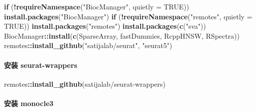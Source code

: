 \documentclass[
]{article}
\newenvironment{Shaded}{\begin{snugshade}}{\end{snugshade}}
\newcommand{\ControlFlowTok}[1]{\textcolor[rgb]{0.13,0.29,0.53}{\textbf{#1}}}
\newcommand{\DataTypeTok}[1]{\textcolor[rgb]{0.13,0.29,0.53}{#1}}
\newcommand{\KeywordTok}[1]{\textcolor[rgb]{0.13,0.29,0.53}{\textbf{#1}}}
\newcommand{\NormalTok}[1]{#1}
\newcommand{\OperatorTok}[1]{\textcolor[rgb]{0.81,0.36,0.00}{\textbf{#1}}}
\newcommand{\OtherTok}[1]{\textcolor[rgb]{0.56,0.35,0.01}{#1}}
\newcommand{\StringTok}[1]{\textcolor[rgb]{0.31,0.60,0.02}{#1}}
\begin{document}
\begin{Shaded}
\begin{Highlighting}[]
\ControlFlowTok{if}\NormalTok{ (}\OperatorTok{!}\KeywordTok{requireNamespace}\NormalTok{(}\StringTok{"BiocManager"}\NormalTok{, }\DataTypeTok{quietly =} \OtherTok{TRUE}\NormalTok{))}
    \KeywordTok{install.packages}\NormalTok{(}\StringTok{"BiocManager"}\NormalTok{)}
\ControlFlowTok{if}\NormalTok{ (}\OperatorTok{!}\KeywordTok{requireNamespace}\NormalTok{(}\StringTok{"remotes"}\NormalTok{, }\DataTypeTok{quietly =} \OtherTok{TRUE}\NormalTok{))}
    \KeywordTok{install.packages}\NormalTok{(}\StringTok{"remotes"}\NormalTok{)}
\KeywordTok{install.packages}\NormalTok{(}\KeywordTok{c}\NormalTok{(}\StringTok{"sva"}\NormalTok{))}
\NormalTok{BiocManager}\OperatorTok{::}\KeywordTok{install}\NormalTok{(}\KeywordTok{c}\NormalTok{(}\StringTok{\textquotesingle{}SparseArray\textquotesingle{}}\NormalTok{, }\StringTok{\textquotesingle{}fastDummies\textquotesingle{}}\NormalTok{, }\StringTok{\textquotesingle{}RcppHNSW\textquotesingle{}}\NormalTok{, }\StringTok{\textquotesingle{}RSpectra\textquotesingle{}}\NormalTok{))}
\NormalTok{remotes}\OperatorTok{::}\KeywordTok{install\_github}\NormalTok{(}\StringTok{"satijalab/seurat"}\NormalTok{, }\StringTok{"seurat5"}\NormalTok{)}
\end{Highlighting}
\end{Shaded}

\hypertarget{ux5b89ux88c5-seurat-wrappers}{%
\paragraph{安装 seurat-wrappers}\label{ux5b89ux88c5-seurat-wrappers}}

\begin{Shaded}
\begin{Highlighting}[]
\NormalTok{remotes}\OperatorTok{::}\KeywordTok{install\_github}\NormalTok{(}\StringTok{\textquotesingle{}satijalab/seurat{-}wrappers\textquotesingle{}}\NormalTok{)}
\end{Highlighting}
\end{Shaded}

\hypertarget{ux5b89ux88c5-monocle3}{%
\paragraph{安装 monocle3}\label{ux5b89ux88c5-monocle3}}
\end{document}
